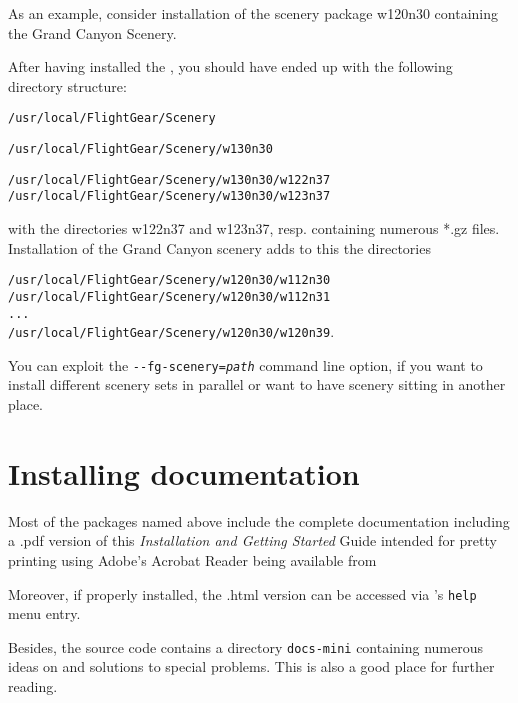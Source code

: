 As an example, consider installation of the scenery package w120n30 containing the Grand
Canyon Scenery.

After having installed the , you should have ended up with the
following directory structure:
\medskip

\noindent
 \texttt{/usr/local/FlightGear/Scenery}

\noindent
 \texttt{/usr/local/FlightGear/Scenery/w130n30}

\noindent
 \texttt{/usr/local/FlightGear/Scenery/w130n30/w122n37}\\
 \texttt{/usr/local/FlightGear/Scenery/w130n30/w123n37}
 \medskip

\noindent 
 with the directories w122n37 and w123n37, resp. containing numerous *.gz
files. Installation of the Grand Canyon scenery adds to this the directories
\medskip

\noindent
 \texttt{/usr/local/FlightGear/Scenery/w120n30/w112n30}\\
 \texttt{/usr/local/FlightGear/Scenery/w120n30/w112n31}\\
 \texttt{...}\\
 \texttt{/usr/local/FlightGear/Scenery/w120n30/w120n39}.
 \medskip

You can exploit the \texttt{-$ $-fg-scenery={\it path}} command line option, if you want to install different scenery sets in parallel or want to have scenery sitting in another place.

\section{Installing documentation}

Most of the packages named above include the complete \FlightGear{} documentation
including a .pdf version of this \textit{Installation and Getting Started} Guide intended
for pretty printing using Adobe's Acrobat Reader being available from
 \medskip

 \medskip

 \noindent
 Moreover, if properly installed, the .html version can be accessed via
\FlightGear{}'s \texttt{help} menu entry.

Besides, the source code contains a directory \texttt{docs-mini} containing numerous
ideas on and solutions to special problems. This is also a good place for further
reading.

